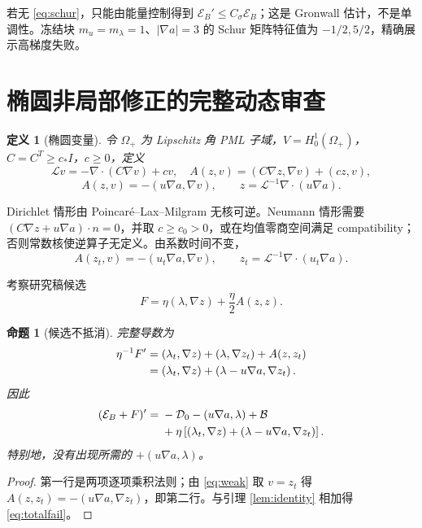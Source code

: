 \documentclass[UTF8,a4paper,11pt]{ctexart}
\newtheorem{definition}{定义}
\newtheorem{proposition}{命题}
\newcommand{\E}{\mathcal E}
\newcommand{\D}{\mathcal D}
\newcommand{\Om}{\Omega}
\newcommand{\ip}[2]{\left(#1,#2\right)}
\begin{document}
若无 \eqref{eq:schur}，只能由能量控制得到 $\E_B'\le C_\sigma\E_B$；这是
Gronwall 估计，不是单调性。冻结块 $m_u=m_\lambda=1$、$|\nabla a|=3$ 的
Schur 矩阵特征值为 $-1/2,5/2$，精确展示高梯度失败。

\section{椭圆非局部修正的完整动态审查}

\begin{definition}[椭圆变量]
令 $\Om_+$ 为 Lipschitz 角 PML 子域，$V=H_0^1(\Om_+)$，
$C=C^T\ge c_*I$，$c\ge0$，定义
\[
 \mathcal Lv=-\nabla\cdot(C\nabla v)+cv,
 \quad A(z,v)=\ip{C\nabla z}{\nabla v}+\ip{cz}{v},
\]
\begin{equation}\label{eq:weak}
 A(z,v)=-\ip{u\nabla a}{\nabla v},\qquad
 z=\mathcal L^{-1}\nabla\cdot(u\nabla a).
\end{equation}
\end{definition}
Dirichlet 情形由 Poincaré--Lax--Milgram 无核可逆。Neumann 情形需要
$(C\nabla z+u\nabla a)\cdot n=0$，并取 $c\ge c_0>0$，或在均值零商空间满足
compatibility；否则常数核使逆算子无定义。由系数时间不变，
\begin{equation}\label{eq:zt}
 A(z_t,v)=-\ip{u_t\nabla a}{\nabla v},\qquad
 z_t=\mathcal L^{-1}\nabla\cdot(u_t\nabla a).
\end{equation}

考察研究稿候选
\[
 F=\eta\ip\lambda{\nabla z}+\frac\eta2A(z,z).
\]
\begin{proposition}[候选不抵消]\label{prop:fail}
完整导数为
\begin{align}\label{eq:Fprime}
 \eta^{-1}F'&=\ip{\lambda_t}{\nabla z}+\ip\lambda{\nabla z_t}+A(z,z_t)\\
 &=\ip{\lambda_t}{\nabla z}+\ip{\lambda-u\nabla a}{\nabla z_t}.\notag
\end{align}
因此
\begin{align}\label{eq:totalfail}
 (\E_B+F)'={}&-\D_0-\ip{u\nabla a}{\lambda}+\mathcal B\\
 &+\eta\left[\ip{\lambda_t}{\nabla z}
 +\ip{\lambda-u\nabla a}{\nabla z_t}\right].\notag
\end{align}
特别地，没有出现所需的 $+\ip{u\nabla a}{\lambda}$。
\end{proposition}
\begin{proof}
第一行是两项逐项乘积法则；由 \eqref{eq:weak} 取 $v=z_t$ 得
$A(z,z_t)=-\ip{u\nabla a}{\nabla z_t}$，即第二行。与引理
\ref{lem:identity} 相加得 \eqref{eq:totalfail}。
\end{proof}
\end{document}
